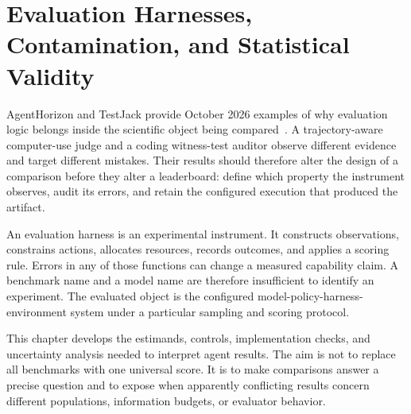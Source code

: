 \chapter{Evaluation Harnesses, Contamination, and Statistical Validity}\label{ch:C26}
AgentHorizon and TestJack provide October 2026 examples of why evaluation logic belongs inside the scientific object being compared~\cite{corpus261011050,yao2026testjack}. A trajectory-aware computer-use judge and a coding witness-test auditor observe different evidence and target different mistakes. Their results should therefore alter the design of a comparison before they alter a leaderboard: define which property the instrument observes, audit its errors, and retain the configured execution that produced the artifact.

An evaluation harness is an experimental instrument. It constructs observations, constrains actions, allocates resources, records outcomes, and applies a scoring rule. Errors in any of those functions can change a measured capability claim. A benchmark name and a model name are therefore insufficient to identify an experiment. The evaluated object is the configured model-policy-harness-environment system under a particular sampling and scoring protocol.

This chapter develops the estimands, controls, implementation checks, and uncertainty analysis needed to interpret agent results. The aim is not to replace all benchmarks with one universal score. It is to make comparisons answer a precise question and to expose when apparently conflicting results concern different populations, information budgets, or evaluator behavior.









